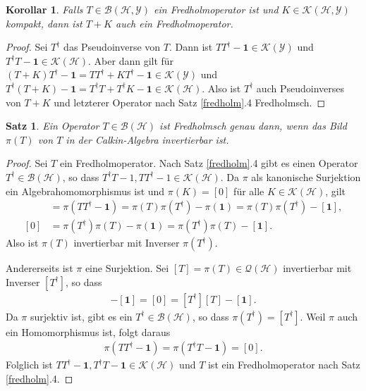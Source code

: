 \documentclass[11pt, hidelinks]{article}
\newcommand{\h}{\mathcal{H}}
\numberwithin{conj}{section}
\newtheorem{theorem}[conj]{Satz}
\newtheorem{corollary}[conj]{Korollar}
\begin{document}
\begin{corollary}
    \label{summeFredholm}
    Falls $T \in \mathcal{B}(\h,\mathcal{Y})$ ein Fredholmoperator ist und $K \in \mathcal{K}(\h,\mathcal{Y})$ kompakt, dann ist $T+K$ auch ein Fredholmoperator.
\end{corollary}

\begin{proof}
Sei $T^\dagger$ das Pseudoinverse von $T$. Dann ist $TT^\dagger - \mathbf{1} \in \mathcal{K}(\mathcal{Y})$ und $T^\dagger T - \mathbf{1} \in \mathcal{K}(\h)$. Aber dann gilt für $(T+K)T^\dagger - \mathbf{1} = TT^\dagger + KT^\dagger - \mathbf{1} \in \mathcal{K}(\mathcal{Y})$ und $T^\dagger (T+K) -\mathbf{1} = T^\dagger T+ T^\dagger K -\mathbf{1}  \in \mathcal{K}(\h)$. Also ist $T^\dagger$ auch Pseudoinverses von $T+K$ und letzterer Operator nach Satz \ref{fredholm}.4 Fredholmsch.
\end{proof}


\begin{theorem}
    Ein Operator $T \in \mathcal{B}(\h)$ ist Fredholmsch genau dann, wenn das Bild $\pi(T)$ von $T$ in der Calkin-Algebra invertierbar ist.
\end{theorem}

\begin{proof}
    Sei $T$ ein Fredholmoperator. Nach Satz \ref{fredholm}.4 gibt es einen Operator $T^\dagger \in \mathcal{B}(\h)$, so dass $T^\dagger T - 1, TT^\dagger - 1 \in \mathcal{K}(\h)$. Da $\pi$ als kanonische Surjektion ein Algebrahomomorphismus ist und $\pi(K) = [0]$ für alle $K \in \mathcal{K}(\h)$, gilt
    \begin{align}
        [0] &=  \pi(TT^\dagger - \mathbf{1}) = \pi(T)\pi(T^\dagger) - \pi(\mathbf{1}) = \pi(T)\pi(T^\dagger)-[\mathbf{1}], \\
        [0] &= \pi(T^\dagger)\pi(T)-\pi(\mathbf{1}) = \pi(T^\dagger)\pi(T)-[\mathbf{1}].
    \end{align}
    Also ist $\pi(T)$ invertierbar mit Inverser $\pi(T^\dagger)$.

    Andererseits ist $\pi$ eine Surjektion. Sei $[T] = \pi(T) \in \mathcal{Q}(\h)$ invertierbar mit Inverser $[T^\dagger]$, so dass
    \begin{align}
        [T][T^\dagger] - [\mathbf{1}] = [0] =[T^\dagger][T] - [\mathbf{1}].
    \end{align}
    Da $\pi$ surjektiv ist, gibt es ein $T^\dagger \in \mathcal{B}(\h)$, so dass $\pi(T^\dagger) = [T^\dagger]$. Weil $\pi$ auch ein Homomorphismus ist, folgt daraus
    \begin{align}
        \pi(TT^\dagger - \mathbf{1}) = \pi(T^\dagger T -\mathbf{1}) = [0].
    \end{align}
    Folglich ist $TT^\dagger-\mathbf{1}, T^\dagger T -\mathbf{1} \in \mathcal{K}(\h)$ und $T$ ist ein Fredholmoperator nach Satz \ref{fredholm}.4.
\end{proof}
\end{document}
